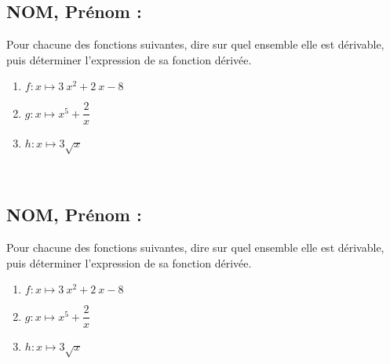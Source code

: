 \documentclass[a4paper,11pt,exos]{nsi} %
\begin{document}
\subsection*{NOM, Prénom : \dotfill} 


\maketitle




\begin{exercice}
    Pour chacune des fonctions suivantes, dire sur quel ensemble elle est dérivable, puis déterminer l'expression de sa fonction dérivée.
    \begin{multicols}{3}
        \begin{enumerate}
            \item $f:x\longmapsto 3~{ x}^{2}+2~ x-8$
        
            \item $g:x\longmapsto { x}^{5}+\dfrac{2}{ x}$
            \item $h:x\longmapsto 3\sqrt{ x}$
        \end{enumerate}
    \end{multicols}
    
\end{exercice}
\\



\subsection*{NOM, Prénom : \dotfill} 


\maketitle




\begin{exercice}
    Pour chacune des fonctions suivantes, dire sur quel ensemble elle est dérivable, puis déterminer l'expression de sa fonction dérivée.
    \begin{multicols}{3}
        \begin{enumerate}
            \item $f:x\longmapsto 3~{ x}^{2}+2~ x-8$
        
            \item $g:x\longmapsto { x}^{5}+\dfrac{2}{ x}$
            \item $h:x\longmapsto 3\sqrt{ x}$
        \end{enumerate}
    \end{multicols}
    
\end{exercice}

\end{document}
